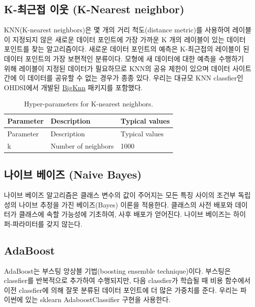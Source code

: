 \documentclass[11pt]{book}
\theoremstyle{definition}
\theoremstyle{definition}
\theoremstyle{definition}
\theoremstyle{remark}
\begin{document}
\subsection{K-최근접 이웃 (K-Nearest
neighbor)}\label{k---k-nearest-neighbor}

KNN(K-nearest neighbors)은 몇 개의 거리 척도(distance metric)를 사용하여
레이블이 지정되지 않은 새로운 데이터 포인트에 가장 가까운 K 개의
레이블이 있는 데이터 포인트를 찾는 알고리즘이다. 새로운 데이터 포인트의
예측은 K-최근접의 레이블이 된 데이터 포인트의 가장 보편적인 분류이다.
모형에 새 데이터에 대한 예측을 수행하기 위해 레이블이 지정된 데이터가
필요하므로 KNN의 공유 제한이 있으며 데이터 사이트 간에 이 데이터를
공유할 수 없는 경우가 종종 있다. 우리는 대규모 KNN classfier인 OHDSI에서
개발된 \href{https://github.com/OHDSI/BigKnn}{BigKnn} 패키지를 포함했다.
 

\begin{longtable}[]{@{}lll@{}}
\caption{\label{tab:knnParameters} Hyper-parameters for K-nearest
neighbors.}\tabularnewline
\toprule
Parameter & Description & Typical values\tabularnewline
\midrule
\endfirsthead
\toprule
Parameter & Description & Typical values\tabularnewline
\midrule
\endhead
k & Number of neighbors & 1000\tabularnewline
\bottomrule
\end{longtable}

\subsection{나이브 베이즈 (Naive Bayes)}\label{--naive-bayes}

나이브 베이즈 알고리즘은 클래스 변수의 값이 주어지는 모든 특징 사이의
조건부 독립성의 나이브 추정을 가진 베이즈(Bayes) 이론을 적용한다.
클래스의 사전 배포와 데이터가 클래스에 속할 가능성에 기초하여, 사후
배포가 얻어진다. 나이브 베이즈는 하이퍼-파라미터를 갖지 않는다.

\subsection{AdaBoost}\label{adaboost}

AdaBoost는 부스팅 앙상블 기법(boosting ensemble technique)이다. 부스팅은
classfier를 반복적으로 추가하여 수행되지만, 다음 classfier가 학습될 때
비용 함수에서 이전 classfier에 의해 잘못 분류된 데이터 포인트에 더 많은
가중치를 준다. 우리는 파이썬에 있는 sklearn AdaboostClassifier 구현을
사용한다.  
\end{document}
